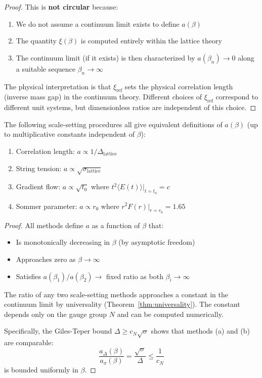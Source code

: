 \begin{proof}
This is \textbf{not circular} because:
\begin{enumerate}
\item We do not assume a continuum limit exists to define $a(\beta)$
\item The quantity $\xi(\beta)$ is computed entirely within the lattice theory
\item The continuum limit (if it exists) is then characterized by $a(\beta_n) \to 0$ along a suitable sequence $\beta_n \to \infty$
\end{enumerate}

The physical interpretation is that $\xi_{\mathrm{ref}}$ sets the physical 
correlation length (inverse mass gap) in the continuum theory. Different 
choices of $\xi_{\mathrm{ref}}$ correspond to different unit systems, but 
dimensionless ratios are independent of this choice.
\end{proof}

\begin{corollary}
\label{cor:equivalent-scales}
The following scale-setting procedures all give equivalent definitions of 
$a(\beta)$ (up to multiplicative constants independent of $\beta$):
\begin{enumerate}[label=(\alph*)]
\item Correlation length: $a \propto 1/\Delta_{\mathrm{lattice}}$
\item String tension: $a \propto \sqrt{\sigma_{\mathrm{lattice}}}$
\item Gradient flow: $a \propto \sqrt{t_0}$ where $t^2 \langle E(t) \rangle |_{t=t_0} = c$
\item Sommer parameter: $a \propto r_0$ where $r^2 F(r)|_{r=r_0} = 1.65$
\end{enumerate}
\end{corollary}

\begin{proof}
All methods define $a$ as a function of $\beta$ that:
\begin{itemize}
\item Is monotonically decreasing in $\beta$ (by asymptotic freedom)
\item Approaches zero as $\beta \to \infty$
\item Satisfies $a(\beta_1)/a(\beta_2) \to$ fixed ratio as both $\beta_i \to \infty$
\end{itemize}

The ratio of any two scale-setting methods approaches a constant in the 
continuum limit by universality (Theorem~\ref{thm:universality}). The constant 
depends only on the gauge group $N$ and can be computed numerically.

Specifically, the Giles-Teper bound $\Delta \geq c_N \sqrt{\sigma}$ shows 
that methods (a) and (b) are comparable:
\[
\frac{a_{\Delta}(\beta)}{a_{\sigma}(\beta)} = \frac{\sqrt{\sigma}}{\Delta} \leq \frac{1}{c_N}
\]
is bounded uniformly in $\beta$.
\end{proof}


